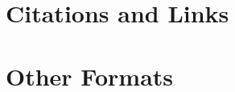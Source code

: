 \documentclass[12pt]{novax}
\begin{document}
\chapter{Citations and Links}\label{ch:3}


\chapter{Other Formats}\label{ch:4}



\begin{singlespacing}
  \renewcommand{\bibname}{References}

  \nocite{*}
  
  
\end{singlespacing}


\end{document}
